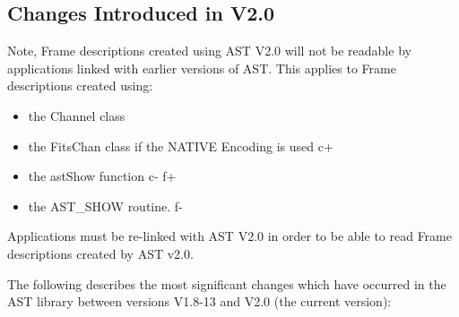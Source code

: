 \documentclass[twoside,11pt]{article}
\begin{document}
\subsection{Changes Introduced in V2.0}

Note, Frame descriptions created using AST V2.0 will not be readable by
applications linked with earlier versions of AST. This applies to Frame
descriptions created using:
\begin{itemize}
\item the Channel class
\item the FitsChan class if the NATIVE Encoding is used
c+
\item the astShow function
c-
f+
\item the AST\_SHOW routine.
f-
\end{itemize}

Applications must be re-linked with AST V2.0 in order to be able to read
Frame descriptions created by AST v2.0.

The following describes the most significant changes which have
occurred in the AST library between versions V1.8-13 and V2.0 (the
current version):
\end{document}
